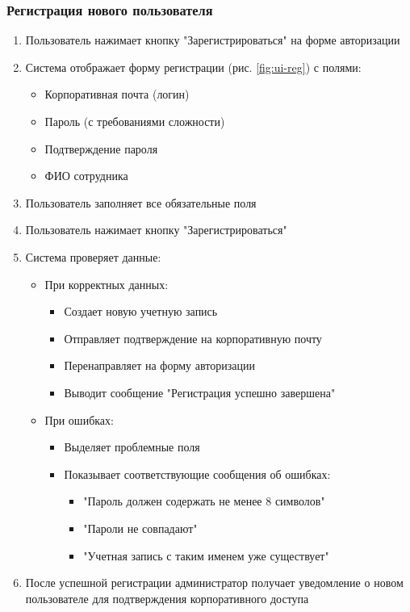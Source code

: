 \subsubsection{Регистрация нового пользователя}
\begin{enumerate}
	\item Пользователь нажимает кнопку "Зарегистрироваться" на форме авторизации
	\item Система отображает форму регистрации (рис. \ref{fig:ui-reg}) с полями:
	\begin{itemize}
		\item Корпоративная почта (логин)
		\item Пароль (с требованиями сложности)
		\item Подтверждение пароля
		\item ФИО сотрудника
	\end{itemize}
	\item Пользователь заполняет все обязательные поля
	\item Пользователь нажимает кнопку "Зарегистрироваться"
	\item Система проверяет данные:
	\begin{itemize}
		\item При корректных данных:
		\begin{itemize}
			\item Создает новую учетную запись
			\item Отправляет подтверждение на корпоративную почту
			\item Перенаправляет на форму авторизации
			\item Выводит сообщение "Регистрация успешно завершена"
		\end{itemize}
		\item При ошибках:
		\begin{itemize}
			\item Выделяет проблемные поля
			\item Показывает соответствующие сообщения об ошибках:
			\begin{itemize}
				\item "Пароль должен содержать не менее 8 символов"
				\item "Пароли не совпадают"
				\item "Учетная запись с таким именем уже существует"
			\end{itemize}
		\end{itemize}
	\end{itemize}
	\item После успешной регистрации администратор получает уведомление о новом пользователе для подтверждения корпоративного доступа
\end{enumerate}

